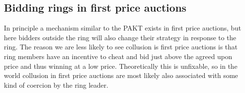 \subsection{Bidding rings in first price auctions}
In principle a mechanism similar to the PAKT exists in first price auctions, but here bidders outside the ring will also change their strategy in response to the ring. The reason we are less likely to see collusion is first price auctions is that ring members have an incentive to cheat and bid just above the agreed upon price and thus winning at a low price. Theoretically this is unfixable, so in the world collusion in first price auctions are most likely also associated with some kind of coercion by the ring leader. 